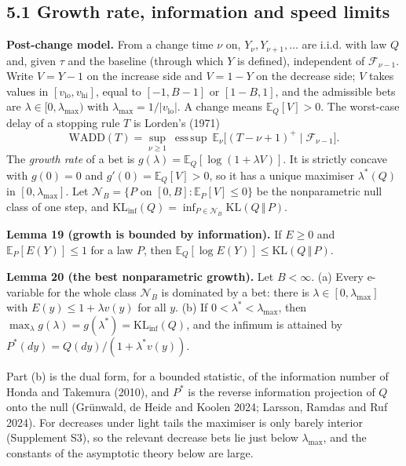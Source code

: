 \documentclass[
]{article}
\begin{document}
\hypertarget{growth-rate-information-and-speed-limits}{%
\subsection{5.1 Growth rate, information and speed
limits}\label{growth-rate-information-and-speed-limits}}

\textbf{Post-change model.} From a change time \(\nu\) on,
\(Y_\nu, Y_{\nu+1}, \dots\) are i.i.d. with law \(Q\) and, given
\(\tau\) and the baseline (through which \(Y\) is defined), independent
of \(\mathcal{F}_{\nu-1}\). Write \(V = Y - 1\) on the increase side and
\(V = 1 - Y\) on the decrease side; \(V\) takes values in
\([v_{\mathrm{lo}}, v_{\mathrm{hi}}]\), equal to \([-1, B-1]\) or
\([1-B, 1]\), and the admissible bets are
\(\lambda \in [0, \lambda_{\max})\) with
\(\lambda_{\max} = 1/\lvert v_{\mathrm{lo}}\rvert\). A change means
\(\mathbb{E}_Q[V] > 0\). The worst-case delay of a stopping rule \(T\)
is Lorden's (1971) \[
\mathrm{WADD}(T) = \sup_{\nu \ge 1}\ \operatorname{ess\,sup}\ \mathbb{E}_\nu\big[(T - \nu + 1)^+ \mid \mathcal{F}_{\nu-1}\big].
\] The \emph{growth rate} of a bet is
\(g(\lambda) = \mathbb{E}_Q[\log(1 + \lambda V)]\). It is strictly
concave with \(g(0) = 0\) and \(g'(0) = \mathbb{E}_Q[V] > 0\), so it has
a unique maximiser \(\lambda^\ast(Q)\) in \([0, \lambda_{\max}]\). Let
\(\mathcal{N}_B = \lbrace P \text{ on } [0, B] : \mathbb{E}_P[V] \le 0 \rbrace\)
be the nonparametric null class of one step, and
\(\mathrm{KL}_{\inf}(Q) = \inf_{P \in \mathcal{N}_B} \mathrm{KL}(Q \,\Vert\, P)\).

\textbf{Lemma 19 (growth is bounded by information).} If \(E \ge 0\) and
\(\mathbb{E}_P[E(Y)] \le 1\) for a law \(P\), then
\(\mathbb{E}_Q[\log E(Y)] \le \mathrm{KL}(Q \,\Vert\, P)\).

\textbf{Lemma 20 (the best nonparametric growth).} Let \(B < \infty\).
(a) Every e-variable for the whole class \(\mathcal{N}_B\) is dominated
by a bet: there is \(\lambda \in [0, \lambda_{\max}]\) with
\(E(y) \le 1 + \lambda v(y)\) for all \(y\). (b) If
\(0 < \lambda^\ast < \lambda_{\max}\), then
\(\max_\lambda g(\lambda) = g(\lambda^\ast) = \mathrm{KL}_{\inf}(Q)\),
and the infimum is attained by
\(P^\ast(dy) = Q(dy)/(1 + \lambda^\ast v(y))\).

Part (b) is the dual form, for a bounded statistic, of the information
number of Honda and Takemura (2010), and \(P^\ast\) is the reverse
information projection of \(Q\) onto the null (Grünwald, de Heide and
Koolen 2024; Larsson, Ramdas and Ruf 2024). For decreases under light
tails the maximiser is only barely interior (Supplement S3), so the
relevant decrease bets lie just below \(\lambda_{\max}\), and the
constants of the asymptotic theory below are large.
\end{document}

